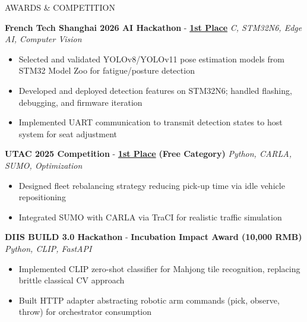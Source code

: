 \documentclass{resume} %
\begin{document}
\begin{rSection}{AWARDS \& COMPETITION}
\vspace{-1.25em}
\item \textbf{French Tech Shanghai 2026 AI Hackathon} -  \href{https://www.linkedin.com/posts/utseus_hackathon-ai-innovation-activity-7419665729870000128-1pQ7?utm_source=share&utm_medium=member_desktop&rcm=ACoAAAg753cBr2yJYV0Q29TNtiQJozXlz5xMSM0}{\textbf{1st Place}} \textbar\textit{ C, STM32N6, Edge AI, Computer Vision}
\vspace{-3pt}
\begin{itemize}
    \itemsep -3pt
    \item Selected and validated YOLOv8/YOLOv11 pose estimation models from STM32 Model Zoo for fatigue/posture detection
    \item Developed and deployed detection features on STM32N6; handled flashing, debugging, and firmware iteration
    \item Implemented UART communication to transmit detection states to host system for seat adjustment
\end{itemize}
\item \textbf{UTAC 2025 Competition} - \href{https://www.linkedin.com/pulse/lutc-remporte-la-1%C3%A8re-place-%C3%A0-l%C3%A9preuve-libre-du-challenge-utac-jxdve}{\textbf{1st Place}}  \textbf{(Free Category)} \textbar\textit{ Python, CARLA, SUMO, Optimization}
\vspace{-3pt}
\begin{itemize}
    \itemsep -3pt
    \item Designed fleet rebalancing strategy reducing pick-up time via idle vehicle repositioning
    \item Integrated SUMO with CARLA via TraCI for realistic traffic simulation
\end{itemize}
\item \textbf{DIIS BUILD 3.0 Hackathon} - \textbf{Incubation Impact Award (10,000 RMB)} \textbar\textit{ Python, CLIP, FastAPI}
\vspace{-3pt}
\begin{itemize}
    \itemsep -3pt
    \item Implemented CLIP zero-shot classifier for Mahjong tile recognition, replacing brittle classical CV approach
    \item Built HTTP adapter abstracting robotic arm commands (pick, observe, throw) for orchestrator consumption
\end{itemize}
\end{rSection} 
\end{document}
